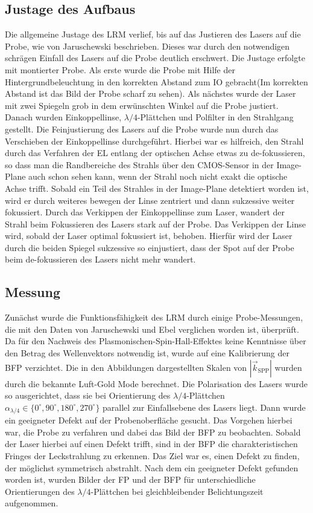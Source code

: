 \documentclass[titlepage]{article}
\begin{document}
\subsection{Justage des Aufbaus}
Die allgemeine Justage des LRM verlief, bis auf das Justieren des Lasers auf die Probe, wie von Jaruschewski \cite{Jaruschewski.2020} beschrieben. Dieses war durch den notwendigen schrägen Einfall des Lasers auf die Probe deutlich erschwert. Die Justage erfolgte mit montierter Probe. Als erste wurde die Probe mit Hilfe der Hintergrundbeleuchtung in den korrekten Abstand zum IO gebracht(Im korrekten Abstand ist das Bild der Probe scharf zu sehen). Als nächstes wurde der Laser mit zwei Spiegeln grob in dem erwünschten Winkel auf die Probe justiert. Danach wurden Einkoppellinse, $\lambda/4$-Plättchen und Polfilter in den Strahlgang gestellt. Die Feinjustierung des Lasers auf die Probe wurde nun durch das Verschieben der Einkoppellinse durchgeführt. Hierbei war es hilfreich, den Strahl durch das Verfahren der EL entlang der optischen Achse etwas zu de-fokussieren, so dass man die Randbereiche des Strahls über den CMOS-Sensor in der Image-Plane auch schon sehen kann, wenn der Strahl noch nicht exakt die optische Achse trifft. Sobald ein Teil des Strahles in der Image-Plane detektiert worden ist, wird er durch weiteres bewegen der Linse zentriert und dann sukzessive weiter fokussiert. Durch das Verkippen der Einkoppellinse zum Laser, wandert der Strahl beim Fokussieren des Lasers stark auf der Probe. Das Verkippen der Linse wird, sobald der Laser optimal fokussiert ist, behoben. Hierfür wird der Laser durch die beiden Spiegel sukzessive so einjustiert, dass der Spot auf der Probe beim de-fokussieren des Lasers nicht mehr wandert. 
\subsection{Messung}
Zunächst wurde die Funktionsfähigkeit des LRM durch einige Probe-Messungen, die mit den Daten von Jaruschewski \cite{Jaruschewski.2020} und Ebel \cite{ebel.2019} verglichen worden ist, überprüft. Da für den Nachweis des Plasmonischen-Spin-Hall-Effektes keine Kenntnisse über den Betrag des Wellenvektors notwendig ist, wurde auf eine Kalibrierung der BFP verzichtet. Die in den Abbildungen dargestellten Skalen von $|\vec{k}_{\mathrm{SPP}}|$ wurden durch die bekannte Luft-Gold Mode berechnet. Die Polarisation des Lasers wurde so ausgerichtet, dass sie bei Orientierung des $\lambda/4$-Plättchen $\alpha_{\lambda/4} \in \{0^\circ, 90^\circ, 180^\circ, 270^\circ\}$ parallel zur Einfallsebene des Lasers liegt.  Dann wurde ein geeigneter Defekt auf der Probenoberfläche gesucht. Das Vorgehen hierbei war, die Probe zu verfahren und dabei das Bild der BFP zu beobachten. Sobald der Laser hierbei auf einen Defekt trifft, sind in der BFP die charakteristischen Fringes der Leckstrahlung zu erkennen. Das Ziel war es, einen Defekt zu finden, der möglichst symmetrisch abstrahlt. Nach dem ein geeigneter Defekt gefunden worden ist, wurden Bilder der FP und der BFP für unterschiedliche Orientierungen des $\lambda/4$-Plättchen bei gleichbleibender Belichtungszeit aufgenommen.
\end{document}
